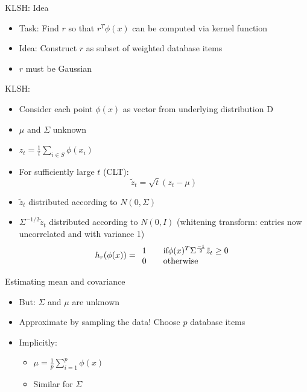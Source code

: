 \documentclass[12pt,a4paper]{beamer}
\begin{document}
\begin{frame}{KLSH: Idea}
\begin{itemize}
\item Task: Find $r$ so that $r^T\phi (x)$ can be computed via kernel function
\item Idea: Construct $r$ as subset of weighted database items
\item $r$ must be Gaussian
\end{itemize}
\end{frame}

\begin{frame}{KLSH: }
\begin{itemize}
\item Consider each point $\phi(x)$ as vector from underlying distribution D
\item $\mu$ and $\Sigma$ unknown
\item $z_{t} = \frac{1}{t}\sum_{i \in S}{\phi (x_{i})}$
\item For sufficiently large $t$ (CLT):
$$ \tilde{z}_{t} = \sqrt{t}(z_{t} - \mu) $$
\item $ \tilde{z}_{t}$ distributed according to  $N(0,\Sigma)$
\item $\Sigma^{-1/2}\tilde{z}_{t}$ distributed according to $N(0,I)$ (whitening transform: entries now uncorrelated and with variance 1)
$$h_r(\phi ( x) )= \begin{array}{l l}
    1 & \quad \text{if} \phi (x)^{T} \Sigma^{\frac{-1}{2}}\tilde{z}_{t} \geq 0\\
    0 & \quad \text{otherwise}
  \end{array}$$
\end{itemize}
\end{frame}



\begin{frame}{Estimating mean and covariance}
\begin{itemize}
\item But: $\Sigma$ and $\mu$ are unknown
\item Approximate by sampling the data! Choose $p$ database items
\item Implicitly:
    \begin{itemize}
    \item $\mu = \frac{1}{p}\sum_{i=1}^{p}\phi(x)$
    \item Similar for $\Sigma$
    \end{itemize}
\end{itemize}
\end{frame}
\end{document}
